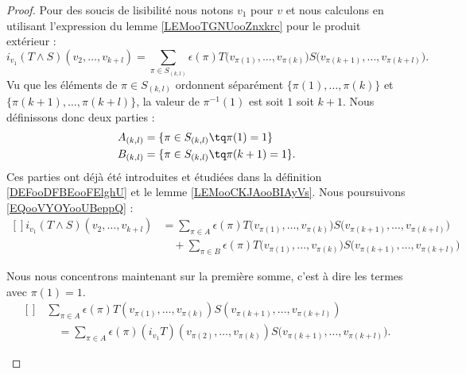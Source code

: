\begin{proof}
	Pour des soucis de lisibilité nous notons \( v_1\) pour \( v\) et nous calculons en utilisant l'expression du lemme \ref{LEMooTGNUooZnxkrc} pour le produit extérieur :
	\begin{equation}		\label{EQooVYOYooUBeppQ}
		i_{v_1}(T\wedge S)(v_2,\ldots,v_{k+l})  =\sum_{\pi\in S_{(k,l)}}\epsilon(\pi)T\big( v_{\pi(1)},\ldots,v_{\pi(k)} \big)S\big( v_{\pi(k+1)},\ldots,v_{\pi(k+l)} \big).
	\end{equation}
	Vu que les éléments de \( \pi\in S_{(k,l)}\) ordonnent séparément \( \{ \pi(1),\ldots,\pi(k) \}\) et \( \{ \pi(k+1),\ldots,\pi(k+l) \}\), la valeur de \( \pi^{-1}(1)\) est soit \( 1\) soit \( k+1\). Nous définissons donc deux parties :
	\begin{subequations}
		\begin{align}
			A_{(k,l)} & =\{ \pi\in S_{(k,l)}\tq \pi(1)=1 \}    \\
			B_{(k,l)} & =\{ \pi\in S_{(k,l)}\tq \pi(k+1)=1 \}.
		\end{align}
	\end{subequations}
	Ces parties ont déjà été introduites et étudiées dans la définition \ref{DEFooDFBEooFElghU} et le lemme \ref{LEMooCKJAooBIAyVs}. Nous poursuivons \eqref{EQooVYOYooUBeppQ} :
	\begin{equation}		\label{EQooHZYQooHxoAYB}
		\begin{aligned}[]
			i_{v_1}(T\wedge S)(v_2,\ldots,v_{k+l}) & =\sum_{\pi\in A}\epsilon(\pi)T\big( v_{\pi(1)},\ldots,v_{\pi(k)} \big)S\big( v_{\pi(k+1)},\ldots,v_{\pi(k+l)} \big)       \\
			                                       & \quad +\sum_{\pi\in B}\epsilon(\pi)T\big( v_{\pi(1)},\ldots,v_{\pi(k)} \big)S\big( v_{\pi(k+1)},\ldots,v_{\pi(k+l)} \big)
		\end{aligned}
	\end{equation}
	\begin{subproof}
		Nous nous concentrons maintenant sur la première somme, c'est à dire les termes avec \( \pi(1)=1\).
		\begin{equation}
			\begin{aligned}[]
				 & \sum_{\pi\in A}\epsilon(\pi)T(v_{\pi(1)},\ldots,v_{\pi(k)})S(v_{\pi(k+1)},\ldots,v_{\pi(k+l)})                           \\
				 & \quad=\sum_{\pi\in A}\epsilon(\pi)(i_{v_1}T)(v_{\pi(2)},\ldots,v_{\pi(k)})S\big( v_{\pi(k+1)},\ldots,v_{\pi(k+l)} \big).

\end{aligned}
\end{equation}
\end{subproof}
\end{proof}

